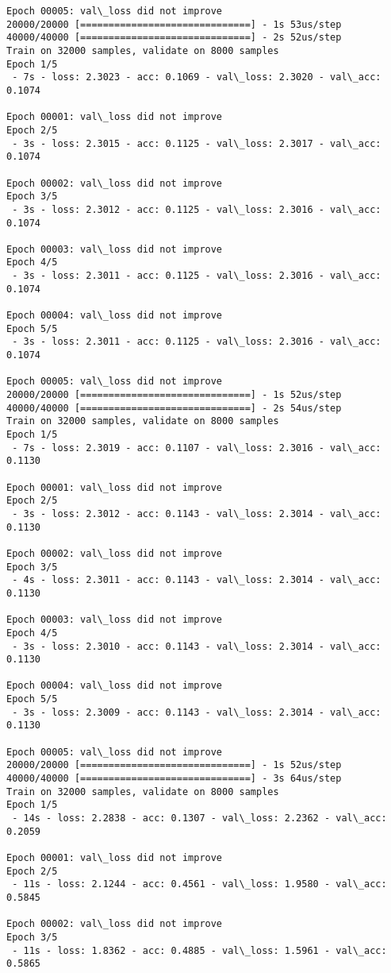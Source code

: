 \documentclass[11pt]{article}
\begin{document}
\begin{Verbatim}[commandchars=\\\{\}]
Epoch 00005: val\_loss did not improve
20000/20000 [==============================] - 1s 53us/step
40000/40000 [==============================] - 2s 52us/step
Train on 32000 samples, validate on 8000 samples
Epoch 1/5
 - 7s - loss: 2.3023 - acc: 0.1069 - val\_loss: 2.3020 - val\_acc: 0.1074

Epoch 00001: val\_loss did not improve
Epoch 2/5
 - 3s - loss: 2.3015 - acc: 0.1125 - val\_loss: 2.3017 - val\_acc: 0.1074

Epoch 00002: val\_loss did not improve
Epoch 3/5
 - 3s - loss: 2.3012 - acc: 0.1125 - val\_loss: 2.3016 - val\_acc: 0.1074

Epoch 00003: val\_loss did not improve
Epoch 4/5
 - 3s - loss: 2.3011 - acc: 0.1125 - val\_loss: 2.3016 - val\_acc: 0.1074

Epoch 00004: val\_loss did not improve
Epoch 5/5
 - 3s - loss: 2.3011 - acc: 0.1125 - val\_loss: 2.3016 - val\_acc: 0.1074

Epoch 00005: val\_loss did not improve
20000/20000 [==============================] - 1s 52us/step
40000/40000 [==============================] - 2s 54us/step
Train on 32000 samples, validate on 8000 samples
Epoch 1/5
 - 7s - loss: 2.3019 - acc: 0.1107 - val\_loss: 2.3016 - val\_acc: 0.1130

Epoch 00001: val\_loss did not improve
Epoch 2/5
 - 3s - loss: 2.3012 - acc: 0.1143 - val\_loss: 2.3014 - val\_acc: 0.1130

Epoch 00002: val\_loss did not improve
Epoch 3/5
 - 4s - loss: 2.3011 - acc: 0.1143 - val\_loss: 2.3014 - val\_acc: 0.1130

Epoch 00003: val\_loss did not improve
Epoch 4/5
 - 3s - loss: 2.3010 - acc: 0.1143 - val\_loss: 2.3014 - val\_acc: 0.1130

Epoch 00004: val\_loss did not improve
Epoch 5/5
 - 3s - loss: 2.3009 - acc: 0.1143 - val\_loss: 2.3014 - val\_acc: 0.1130

Epoch 00005: val\_loss did not improve
20000/20000 [==============================] - 1s 52us/step
40000/40000 [==============================] - 3s 64us/step
Train on 32000 samples, validate on 8000 samples
Epoch 1/5
 - 14s - loss: 2.2838 - acc: 0.1307 - val\_loss: 2.2362 - val\_acc: 0.2059

Epoch 00001: val\_loss did not improve
Epoch 2/5
 - 11s - loss: 2.1244 - acc: 0.4561 - val\_loss: 1.9580 - val\_acc: 0.5845

Epoch 00002: val\_loss did not improve
Epoch 3/5
 - 11s - loss: 1.8362 - acc: 0.4885 - val\_loss: 1.5961 - val\_acc: 0.5865


\end{Verbatim}
\end{document}
